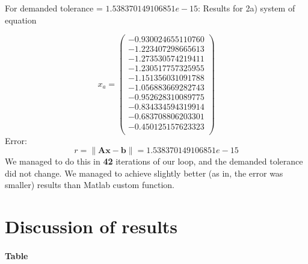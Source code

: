 \documentclass[12pt]{report}
\begin{document}
For demanded tolerance = $1.538370149106851e-15$:
Results for 2a) system of equation

\[ x_a = \left( \begin{array}{cc}
-0.930024655110760 \\
-1.223407298665613 \\
-1.273530574219411 \\
-1.230517757325955 \\
-1.151356031091788 \\
-1.056883669282743 \\
-0.952628310089775 \\
-0.834334594319914 \\
-0.683708806203301 \\
-0.450125157623323 \\
\end{array} \right)
\]
Error:
\[ r = \| \mathbf{A}\mathbf{x} - \mathbf{b}\| = 1.538370149106851e-15 \]
We managed to do this in \textbf{42} iterations of our loop, and the demanded tolerance did not change.
We managed to achieve slightly better (as in, the error was smaller) results than Matlab custom function.


\newpage
\section{Discussion of results}
\paragraph{Table}
\end{document}
